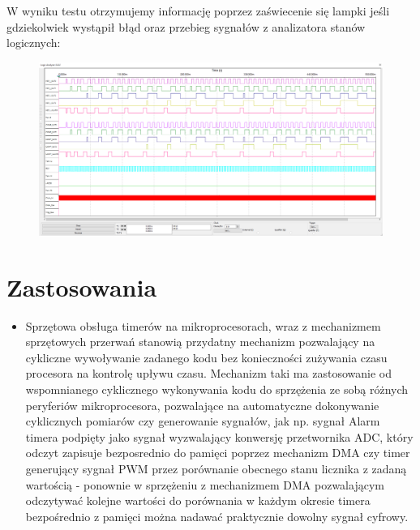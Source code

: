 \documentclass[a4paper]{article}
\begin{document}
\Large
W wyniku testu otrzymujemy informację poprzez zaświecenie się lampki jeśli gdziekolwiek wystąpił błąd oraz 
przebieg sygnałów z analizatora stanów logicznych:
\begin{figure}[H]
    \centering
    \includegraphics[width=\textwidth]{general_test_logic_analyzer.png}
\end{figure}
\pagebreak
\section{Zastosowania}
\begin{itemize}
    \item Sprzętowa obsługa timerów na mikroprocesorach, wraz z mechanizmem sprzętowych przerwań stanowią przydatny mechanizm
            pozwalający na cykliczne wywoływanie zadanego kodu bez konieczności zużywania czasu procesora na kontrolę upływu 
            czasu. Mechanizm taki ma zastosowanie od wspomnianego cyklicznego wykonywania kodu do sprzężenia ze sobą różnych peryferiów
            mikroprocesora, pozwalające na automatyczne dokonywanie cyklicznych pomiarów czy generowanie sygnałów, jak np. 
            sygnał Alarm timera podpięty jako sygnał wyzwalający konwersję przetwornika ADC, który odczyt zapisuje bezposrednio do pamięci
            poprzez mechanizm DMA czy timer generujący sygnał PWM przez porównanie obecnego stanu licznika z zadaną wartością - ponownie
            w sprzężeniu z mechanizmem DMA pozwalającym odczytywać kolejne wartości do porównania w każdym okresie timera bezpośrednio z pamięci
            można nadawać praktycznie dowolny sygnał cyfrowy.  %
\end{itemize}
\end{document}
